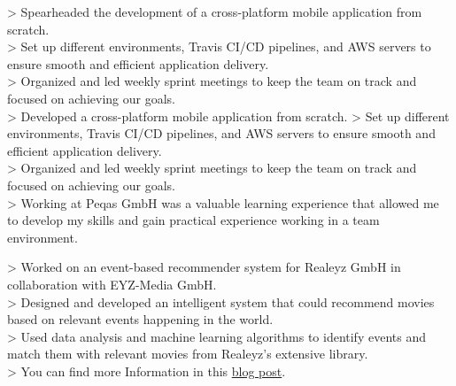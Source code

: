 \documentclass[10pt,a4paper,normalphoto]{altacv}
\begin{document}
\begin{fullwidth}
> Spearheaded the development of a cross-platform mobile application from scratch.\\
> Set up different environments, Travis CI/CD pipelines, and AWS servers to ensure smooth and efficient application delivery.\\
> Organized and led weekly sprint meetings to keep the team on track and focused on achieving our goals.\\
> Developed a cross-platform mobile application from scratch.
> Set up different environments, Travis CI/CD pipelines, and AWS servers to ensure smooth and efficient application delivery.\\
> Organized and led weekly sprint meetings to keep the team on track and focused on achieving our goals.\\
> Working at Peqas GmbH was a valuable learning experience that allowed me to develop my skills and gain practical experience working in a team environment.

\vspace{1em}


\vspace{2em}

> Worked on an event-based recommender system for Realeyz GmbH in collaboration with EYZ-Media GmbH.\\
> Designed and developed an intelligent system that could recommend movies based on relevant events happening in the world.\\
> Used data analysis and machine learning algorithms to identify events and match them with relevant movies from Realeyz's extensive library.\\
> You can find more Information in this \href{https://eyzmedia.de/en/event-based-approach/}{blog post}.

\vspace{1em}



\end{fullwidth}
\end{document}
